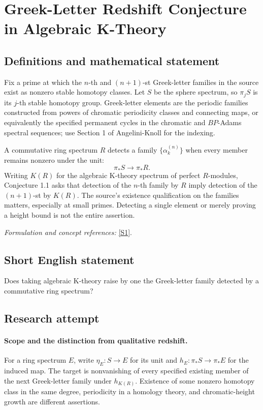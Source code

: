 \documentclass[11pt]{article}
\begin{document}
\section*{\texorpdfstring{Greek-Letter Redshift Conjecture in Algebraic K-Theory}{Greek-Letter Redshift Conjecture in Algebraic K-Theory}}\label{453}
\subsection{Definitions and mathematical statement}
Fix a prime at which the $n$-th and $(n+1)$-st Greek-letter families in the source exist as nonzero stable homotopy classes. Let $S$ be the sphere spectrum, so $\pi_jS$ is its $j$-th stable homotopy group. Greek-letter elements are the periodic families constructed from powers of chromatic periodicity classes and connecting maps, or equivalently the specified permanent cycles in the chromatic and $BP$-Adams spectral sequences; use Section 1 of Angelini-Knoll for the indexing.

A commutative ring spectrum $R$ detects a family $\{\alpha_k^{(n)}\}$ when every member remains nonzero under the unit:
\[
 \pi_*S\longrightarrow\pi_*R.
\]
Writing $K(R)$ for the algebraic K-theory spectrum of perfect $R$-modules, Conjecture 1.1 asks that detection of the $n$-th family by $R$ imply detection of the $(n+1)$-st by $K(R)$. The source's existence qualification on the families matters, especially at small primes. Detecting a single element or merely proving a height bound is not the entire assertion.
\par\smallskip\textit{Formulation and concept references:} \href{https://arxiv.org/abs/1810.10088}{[S1]}.

\subsection{Short English statement}
Does taking algebraic K-theory raise by one the Greek-letter family detected by a commutative ring spectrum?
\subsection{Research attempt}

\paragraph{Scope and the distinction from qualitative redshift.}
For a ring spectrum $E$, write $\eta_E:S\to E$ for its unit and
$h_E:\pi_*S\to\pi_*E$ for the induced map. The target is nonvanishing
of every specified existing member of the next Greek-letter family
under $h_{K(R)}$. Existence of some nonzero homotopy class in the same
degree, periodicity in a homology theory, and chromatic-height growth
are different assertions.
\end{document}
